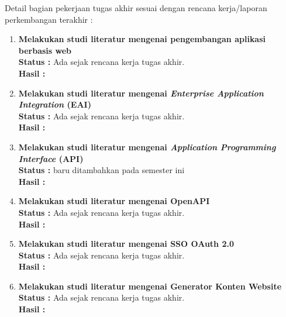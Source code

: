 Detail bagian pekerjaan tugas akhir sesuai dengan rencana kerja/laporan perkembangan terakhir :

\begin{enumerate}
    
    \item \textbf{Melakukan studi literatur mengenai pengembangan aplikasi berbasis web}\\
    {\bf Status :} Ada sejak rencana kerja tugas akhir.\\
    {\bf Hasil :}\\
     
    
    \item \textbf{Melakukan studi literatur mengenai \textit{Enterprise Application Integration} (EAI)}\\
    {\bf Status :} Ada sejak rencana kerja tugas akhir.\\
    {\bf Hasil :}\\
    
    
    \item \textbf{Melakukan studi literatur mengenai \textit{Application Programming Interface} (API)}\\
    {\bf Status :} baru ditambahkan pada semester ini\\
    {\bf Hasil :}\\
    
    
    \item \textbf{Melakukan studi literatur mengenai OpenAPI}\\
    {\bf Status :} Ada sejak rencana kerja tugas akhir.\\
    {\bf Hasil :}\\
    
    
    \item \textbf{Melakukan studi literatur mengenai SSO OAuth 2.0}\\
    {\bf Status :} Ada sejak rencana kerja tugas akhir.\\
    {\bf Hasil :}\\
    
    
    \item \textbf{Melakukan studi literatur mengenai Generator Konten Website}\\
    {\bf Status :} Ada sejak rencana kerja tugas akhir.\\
    {\bf Hasil :}\\
    


\end{enumerate}
